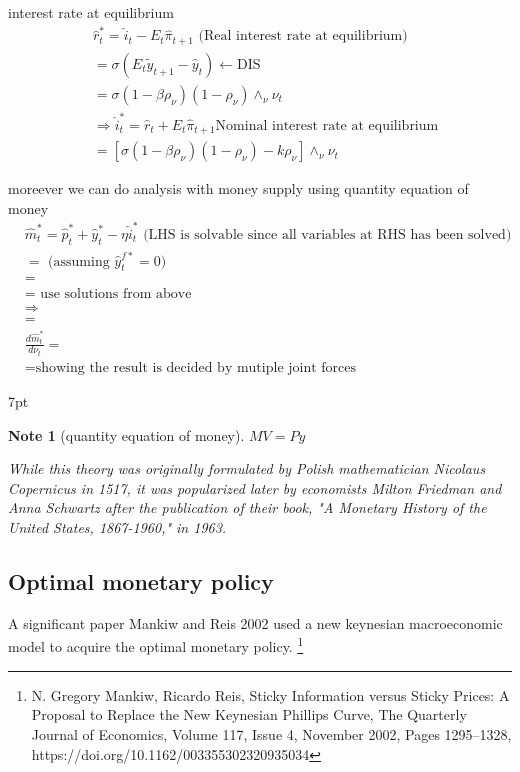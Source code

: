 \documentclass{article}
\newenvironment{blueblock}{
\def\FrameCommand{
  \hspace{1pt}
    {\color{DarkBlue}
    \vrule width 2pt}
    {\color{blueshade}
    \vrule width 4pt}
  \colorbox{blueshade}
}
\MakeFramed{
  \advance
  \hsize-
  \width
  \FrameRestore}
\noindent\hspace{-4.55pt}%
\begin{adjustwidth}{}{7pt}
\vspace{2pt}\vspace{2pt}
}
{\vspace{2pt}\end{adjustwidth}\endMakeFramed}
\newtheorem{note}{Note}
\begin{document}
interest rate at equilibrium
\begin{align}
& \hat r_t^*=\hat i_t- E_t \hat \pi_{t+1} \text{ (Real interest rate at equilibrium)}
\\&= \sigma (E_t \tilde y_{t+1}-\hat y_t)\leftarrow \text{DIS}
\\& = \sigma (1-\beta \rho_\nu)(1-\rho_\nu)\wedge_\nu \nu_t
\\& \Rightarrow \hat i_t^*=\hat r_t+E_t \hat \pi_{t+1} \text{Nominal interest rate at equilibrium}
\\& = [\sigma(1-\beta \rho_\nu)(1-\rho_\nu)-k \rho_\nu]\wedge_\nu \nu_t
\end{align}


moreever we can do analysis with money supply using quantity equation of money
\begin{align}
& \hat m_t^*= \hat p_t^*+\hat y_t^*-\eta \hat i_t^*\text{ (LHS is solvable since all variables at RHS has been solved)}
\\& = \text{ (assuming $\hat y_t^{f*} = 0$)}
\\& = 
\\& = \text{ use solutions from above}
\\& \Rightarrow 
\\& = 
\\& \frac{d \hat m^*_t}{d \nu_t}=
\\& = \text{showing the result is decided by mutiple joint forces}
\end{align}

\begin{blueblock}
\begin{note}[quantity equation of money]

$MV=Py$

While this theory was originally formulated by Polish mathematician Nicolaus Copernicus in 1517, it was popularized later by economists Milton Friedman and Anna Schwartz after the publication of their book, "A Monetary History of the United States, 1867-1960," in 1963.
\end{note}
\end{blueblock}






\subsection{Optimal monetary policy}

A significant paper Mankiw and Reis 2002 used a new keynesian macroeconomic model to acquire the optimal monetary policy.
\footnote{N. Gregory Mankiw, Ricardo Reis, Sticky Information versus Sticky Prices: A Proposal to Replace the New Keynesian Phillips Curve, The Quarterly Journal of Economics, Volume 117, Issue 4, November 2002, Pages 1295–1328, https://doi.org/10.1162/003355302320935034}
  
\end{document}
